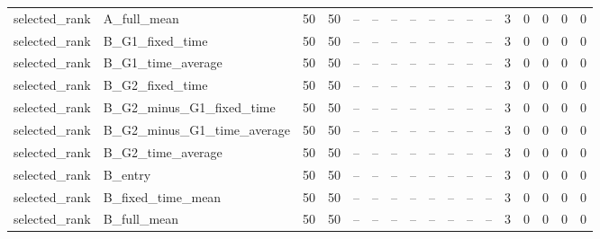 \begin{longtable}{lllllllllllllllll}
selected\_rank & A\_full\_mean & 50 & 50 & -- & -- & -- & -- & -- & -- & -- & -- & 3 & 0 & 0 & 0 & 0 \\
selected\_rank & B\_G1\_fixed\_time & 50 & 50 & -- & -- & -- & -- & -- & -- & -- & -- & 3 & 0 & 0 & 0 & 0 \\
selected\_rank & B\_G1\_time\_average & 50 & 50 & -- & -- & -- & -- & -- & -- & -- & -- & 3 & 0 & 0 & 0 & 0 \\
selected\_rank & B\_G2\_fixed\_time & 50 & 50 & -- & -- & -- & -- & -- & -- & -- & -- & 3 & 0 & 0 & 0 & 0 \\
selected\_rank & B\_G2\_minus\_G1\_fixed\_time & 50 & 50 & -- & -- & -- & -- & -- & -- & -- & -- & 3 & 0 & 0 & 0 & 0 \\
selected\_rank & B\_G2\_minus\_G1\_time\_average & 50 & 50 & -- & -- & -- & -- & -- & -- & -- & -- & 3 & 0 & 0 & 0 & 0 \\
selected\_rank & B\_G2\_time\_average & 50 & 50 & -- & -- & -- & -- & -- & -- & -- & -- & 3 & 0 & 0 & 0 & 0 \\
selected\_rank & B\_entry & 50 & 50 & -- & -- & -- & -- & -- & -- & -- & -- & 3 & 0 & 0 & 0 & 0 \\
selected\_rank & B\_fixed\_time\_mean & 50 & 50 & -- & -- & -- & -- & -- & -- & -- & -- & 3 & 0 & 0 & 0 & 0 \\
selected\_rank & B\_full\_mean & 50 & 50 & -- & -- & -- & -- & -- & -- & -- & -- & 3 & 0 & 0 & 0 & 0 \\
\bottomrule
\end{longtable}
\endgroup
